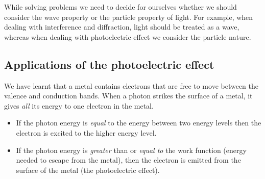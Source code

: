  
While solving problems we need to decide for ourselves whether we should consider the wave property or the particle property of light. For example, when dealing with interference and diffraction, light should be treated as a wave, whereas when dealing with photoelectric effect we consider the particle nature.
 
\subsection{Applications of the photoelectric effect}


We have learnt that a metal contains electrons that are free to move between the valence and conduction bands. When a photon strikes the surface of a metal, it gives \textit{all} its energy to one electron in the metal. 
\begin{itemize}
\item If the photon energy is \textit{equal} to the energy between two energy levels then the electron is excited to the higher energy level.
\item If the photon energy is \textit{greater} than or \textit{equal to} the work function (energy needed to escape from the metal), then the electron is emitted from the surface of the metal (the photoelectric effect). 
\end{itemize}

